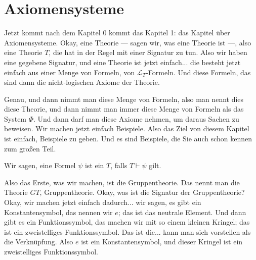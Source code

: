 \section{Axiomensysteme}

\begin{spoken-clean}[01:19:30 - 01:20:59]
Jetzt kommt nach dem Kapitel 0 kommt das Kapitel 1: das Kapitel über Axiomensysteme. Okay, eine Theorie --- sagen wir, was eine Theorie ist ---, also eine Theorie $T$, die hat in der Regel mit einer Signatur zu tun. Also wir haben eine gegebene Signatur, und eine Theorie ist jetzt einfach... die besteht jetzt einfach aus einer Menge von Formeln, von $\mathcal{L}_T$-Formeln. Und diese Formeln, das sind dann die nicht-logischen Axiome der Theorie.

Genau, und dann nimmt man diese Menge von Formeln, also man nennt dies diese Theorie, und dann nimmt man immer diese Menge von Formeln als das System $\Phi$. Und dann darf man diese Axiome nehmen, um daraus Sachen zu beweisen. Wir machen jetzt einfach Beispiele. Also das Ziel von diesem Kapitel ist einfach, Beispiele zu geben. Und es sind Beispiele, die Sie auch schon kennen zum großen Teil.
\end{spoken-clean}

\begin{math-stroke}

Wir sagen, eine Formel $\psi$ ist ein  $T$, falls $T \vdash \psi$ gilt.
\end{math-stroke}

\begin{spoken-clean}[01:21:28 - 01:22:44]
Also das Erste, was wir machen, ist die Gruppentheorie. Das nennt man die Theorie $GT$, Gruppentheorie. Okay, was ist die Signatur der Gruppentheorie? Okay, wir machen jetzt einfach dadurch... wir sagen, es gibt ein Konstantensymbol, das nennen wir $e$; das ist das neutrale Element. Und dann gibt es ein Funktionssymbol, das machen wir mit so einem kleinen Kringel; das ist ein zweistelliges Funktionssymbol. Das ist die... kann man sich vorstellen als die Verknüpfung. Also $e$ ist ein Konstantensymbol, und dieser Kringel ist ein zweistelliges Funktionssymbol.
\end{spoken-clean}

